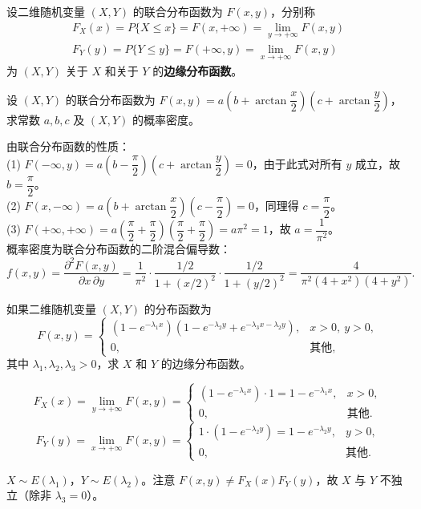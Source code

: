 \documentclass[lang=cn,11pt]{elegantbook}
\begin{document}
\begin{definition}[边缘分布函数] \label{def:marginal-df}
设二维随机变量 $(X,Y)$ 的联合分布函数为 $F(x,y)$，分别称
\begin{align*}
F_X(x) = P\{X \leqslant x\} = F(x, +\infty) = \lim_{y \to +\infty} F(x,y)\\
 F_Y(y) = P\{Y \leqslant y\} = F(+\infty, y) = \lim_{x \to +\infty} F(x,y)
\end{align*}
为 $(X,Y)$ 关于 $X$ 和关于 $Y$ 的\textbf{边缘分布函数}。
\end{definition}

\begin{exercise}\label{exer:3-1}
设 $(X,Y)$ 的联合分布函数为 $F(x,y) = a\left(b + \arctan\dfrac{x}{2}\right)\left(c + \arctan\dfrac{y}{2}\right)$，求常数 $a, b, c$ 及 $(X,Y)$ 的概率密度。
\end{exercise}
\begin{solution}
由联合分布函数的性质：\\
(1) $F(-\infty, y) = a\left(b - \dfrac{\pi}{2}\right)\left(c + \arctan\dfrac{y}{2}\right) = 0$，由于此式对所有 $y$ 成立，故 $b = \dfrac{\pi}{2}$。\\
(2) $F(x, -\infty) = a\left(b + \arctan\dfrac{x}{2}\right)\left(c - \dfrac{\pi}{2}\right) = 0$，同理得 $c = \dfrac{\pi}{2}$。\\
(3) $F(+\infty, +\infty) = a\left(\dfrac{\pi}{2} + \dfrac{\pi}{2}\right)\left(\dfrac{\pi}{2} + \dfrac{\pi}{2}\right) = a\pi^2 = 1$，故 $a = \dfrac{1}{\pi^2}$。\\
概率密度为联合分布函数的二阶混合偏导数：
\[
f(x,y) = \frac{\partial^2 F(x,y)}{\partial x\,\partial y} = \frac{1}{\pi^2} \cdot \frac{1/2}{1 + (x/2)^2} \cdot \frac{1/2}{1 + (y/2)^2} = \frac{4}{\pi^2(4+x^2)(4+y^2)}.
\]
\end{solution}

\begin{exercise}[边缘分布函数] \label{exer:3-c4}
如果二维随机变量 $(X,Y)$ 的分布函数为
\[
F(x,y) = \begin{cases} (1-e^{-\lambda_1 x})(1-e^{-\lambda_2 y} + e^{-\lambda_3 x-\lambda_2 y}), & x > 0,\ y > 0, \\ 0, & \text{其他}, \end{cases}
\]
其中 $\lambda_1, \lambda_2, \lambda_3 > 0$，求 $X$ 和 $Y$ 的边缘分布函数。
\end{exercise}
\begin{solution}
\[
F_X(x) = \lim_{y\to+\infty}F(x,y) = \begin{cases} (1-e^{-\lambda_1 x})\cdot 1 = 1-e^{-\lambda_1 x}, & x > 0, \\ 0, & \text{其他}. \end{cases}
\]
\[
F_Y(y) = \lim_{x\to+\infty}F(x,y) = \begin{cases} 1\cdot(1-e^{-\lambda_2 y}) = 1-e^{-\lambda_2 y}, & y > 0, \\ 0, & \text{其他}. \end{cases}
\]
\begin{note}
$X \sim E(\lambda_1)$，$Y \sim E(\lambda_2)$。注意 $F(x,y) \neq F_X(x)F_Y(y)$，故 $X$ 与 $Y$ 不独立（除非 $\lambda_3 = 0$）。
\end{note}
\end{solution}
\end{document}
